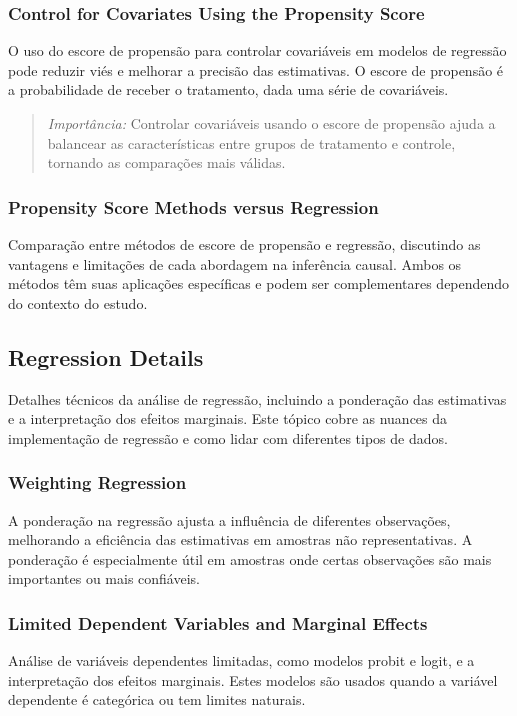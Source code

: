 \documentclass[a4paper,12pt]{article}[abntex2]
\begin{document}
\subsubsection{Control for Covariates Using the Propensity Score}
O uso do escore de propensão para controlar covariáveis em modelos de regressão pode reduzir viés e melhorar a precisão das estimativas. O escore de propensão é a probabilidade de receber o tratamento, dada uma série de covariáveis.

\begin{quote}
\textit{Importância:} Controlar covariáveis usando o escore de propensão ajuda a balancear as características entre grupos de tratamento e controle, tornando as comparações mais válidas.
\end{quote}

\subsubsection{Propensity Score Methods versus Regression}
Comparação entre métodos de escore de propensão e regressão, discutindo as vantagens e limitações de cada abordagem na inferência causal. Ambos os métodos têm suas aplicações específicas e podem ser complementares dependendo do contexto do estudo.

\subsection{Regression Details}
Detalhes técnicos da análise de regressão, incluindo a ponderação das estimativas e a interpretação dos efeitos marginais. Este tópico cobre as nuances da implementação de regressão e como lidar com diferentes tipos de dados.

\subsubsection{Weighting Regression}
A ponderação na regressão ajusta a influência de diferentes observações, melhorando a eficiência das estimativas em amostras não representativas. A ponderação é especialmente útil em amostras onde certas observações são mais importantes ou mais confiáveis.

\subsubsection{Limited Dependent Variables and Marginal Effects}
Análise de variáveis dependentes limitadas, como modelos probit e logit, e a interpretação dos efeitos marginais. Estes modelos são usados quando a variável dependente é categórica ou tem limites naturais.
\end{document}
